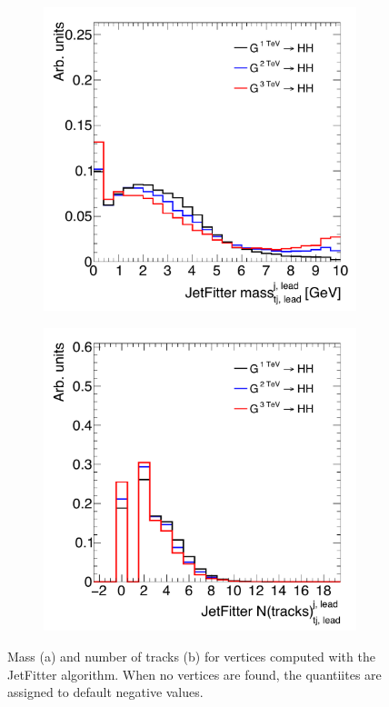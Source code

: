 \begin{figure}[h!]
   \begin{subfigure}[t]{0.5\textwidth}
        \centering
        \includegraphics[width=\textwidth]{figures/LeadTrackJet_JFmass}
        \caption{}
    \end{subfigure}%
    \begin{subfigure}[t]{0.5\textwidth}
        \centering
        \includegraphics[width=\textwidth]{figures/LeadTrackJet_JFntrk}
        \caption{}
    \end{subfigure}

   \caption{Mass (a) and number of tracks (b) for vertices computed with the JetFitter algorithm. When no vertices are found, the quantiites are assigned to default negative values.}
  \label{fig:TrackJetJF}
\end{figure}

